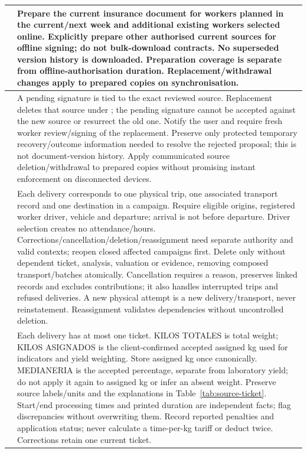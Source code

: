 {\begin{longtable}{L{0.12}L{0.88}}
\midrule
{}\label{br:029}\textbf{} & Prepare the current insurance document for workers planned in the current/next week and additional existing workers selected online. Explicitly prepare other authorised current sources for offline signing; do not bulk-download contracts. No superseded version history is downloaded. Preparation coverage is separate from offline-authorisation duration. Replacement/withdrawal changes apply to prepared copies on synchronisation. \\
\midrule
{}\label{br:030}\textbf{} & A pending signature is tied to the exact reviewed source. Replacement deletes that source under ; the pending signature cannot be accepted against the new source or resurrect the old one. Notify the user and require fresh worker review/signing of the replacement. Preserve only protected temporary recovery/outcome information needed to resolve the rejected proposal; this is not document-version history. Apply communicated source deletion/withdrawal to prepared copies without promising instant enforcement on disconnected devices. \\
\midrule
{}\label{br:031}\textbf{} & Each delivery corresponds to one physical trip, one associated transport record and one destination in a campaign. Require eligible origins, registered worker driver, vehicle and departure; arrival is not before departure. Driver selection creates no attendance/hours. Corrections/cancellation/deletion/reassignment need separate authority and valid contexts; reopen closed affected campaigns first. Delete only without dependent ticket, analysis, valuation or evidence, removing composed transport/batches atomically. Cancellation requires a reason, preserves linked records and excludes contributions; it also handles interrupted trips and refused deliveries. A new physical attempt is a new delivery/transport, never reinstatement. Reassignment validates dependencies without uncontrolled deletion. \\
\midrule
{}\label{br:032}\textbf{} & Each delivery has at most one ticket. KILOS TOTALES is total weight; KILOS ASIGNADOS is the client-confirmed accepted assigned kg used for indicators and yield weighting. Store assigned kg once canonically. MEDIANERIA is the accepted percentage, separate from laboratory yield; do not apply it again to assigned kg or infer an absent weight. Preserve source labels/units and the explanations in Table~\ref{tab:source-ticket}. Start/end processing times and printed duration are independent facts; flag discrepancies without overwriting them. Record reported penalties and application status; never calculate a time-per-kg tariff or deduct twice. Corrections retain one current ticket. \\

\end{longtable}}

